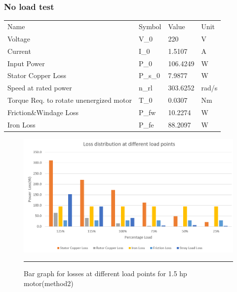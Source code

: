 \subsubsection{No load test}
\begin{table}[]
\begin{tabular}{llll}
    \rowcolor[HTML]{656565} 
    Name                                                              & Symbol  & Value    & Unit  \\
    \cellcolor[HTML]{656565}Voltage                                 & V\_0    & 220      & V       \\
    \rowcolor[HTML]{F2F2F2} 
    \cellcolor[HTML]{656565}Current                                 & I\_0    & 1.5107   & A       \\
    \cellcolor[HTML]{656565}Input Power                             & P\_0    & 106.4249 & W       \\
    \rowcolor[HTML]{F2F2F2} 
    \cellcolor[HTML]{656565}Stator Copper Loss                      & P\_s\_0 & 7.9877   & W       \\
    \cellcolor[HTML]{656565}Speed at rated power                    & n\_rl   & 303.6252 & rad/s   \\
    \rowcolor[HTML]{F2F2F2} 
    \cellcolor[HTML]{656565}Torque Req. to rotate unenergized motor & T\_0    & 0.0307   & Nm      \\
    \cellcolor[HTML]{656565}Friction\&Windage Loss                  & P\_fw   & 10.2274  & W       \\
    \rowcolor[HTML]{F2F2F2} 
    \cellcolor[HTML]{656565}Iron Loss                               & P\_fe   & 88.2097  & W      
\end{tabular}
\end{table}
\begin{figure}[htbp]
	\centering
		\includegraphics[width = 4.5in]{./Figures/MS/fig519.png}
		\rule{35em}{0.5pt}
	\caption{Bar graph for losses at different load points for 1.5 hp motor(method2)}
	\label{fig:Bar graph for losses at different load points for 1.5 hp motor(method2)} 
\end{figure}
